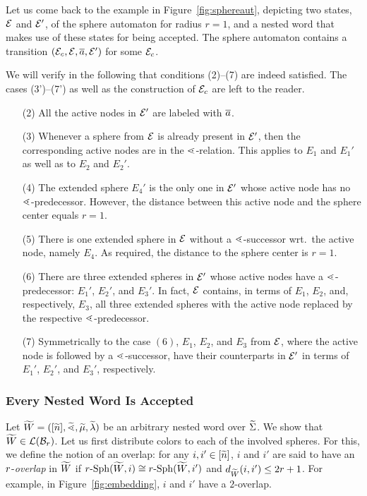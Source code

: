 \documentclass{LMCS}
\begin{document}
Let us come back to the example in Figure~\ref{fig:sphereaut}, depicting two
states, $\mathcal{E}$ and $\mathcal{E}'$, of the sphere automaton for radius $r = 1$,
and a nested word that makes use of these states for being accepted. The
sphere automaton contains a transition $(\mathcal{E}_c,\mathcal{E},{\overline{a}},\mathcal{E}')$ for some
$\mathcal{E}_c$.

We will verify in the following that conditions (2)--(7) are indeed satisfied.
The cases (3')--(7') as well as the construction of $\mathcal{E}_c$ are left to the
reader.
\begin{enumerate}[(2)]\item[(2)] All the active nodes in $\mathcal{E}'$ are labeled with ${\overline{a}}$.
\item[(3)] Whenever a sphere from $\mathcal{E}$ is already present in $\mathcal{E}'$,
  then the corresponding active nodes are in the $\mathrel{\lessdot}$-relation. This
  applies to $E_1$ and $E_1'$ as well as to $E_2$ and $E_2'$.
\item[(4)] The extended sphere $E_4'$ is the only one in $\mathcal{E}'$ whose
  active node has no $\mathrel{\lessdot}$-predecessor. However, the distance between
  this active node and the sphere center equals $r=1$.
\item[(5)] There is one extended sphere in $\mathcal{E}$ without a
  $\mathrel{\lessdot}$-successor wrt.\ the active node, namely $E_4$. As required, the
  distance to the sphere center is $r=1$.
\item[(6)] There are three extended spheres in $\mathcal{E}'$ whose active nodes
  have a $\mathrel{\lessdot}$-predecessor: $E_1'$, $E_2'$, and $E_3'$. In fact, $\mathcal{E}$
  contains, in terms of $E_1$, $E_2$, and, respectively, $E_3$, all three
  extended spheres with the active node replaced by the respective
  $\mathrel{\lessdot}$-predecessor.
\item[(7)] Symmetrically to the case $(6)$, $E_1$, $E_2$, and $E_3$ from
  $\mathcal{E}$, where the active node is followed by a $\mathrel{\lessdot}$-successor, have
  their counterparts in $\mathcal{E}'$ in terms of $E_1'$, $E_2'$, and $E_3'$,
  respectively.
\end{enumerate}

\subsubsection{Every Nested Word Is Accepted}\label{subsect:anyaccepted}

Let ${\widetilde{W}} = ([\widetilde{n}],\widetilde{\mathord{\lessdot}},\widetilde{\mu},\widetilde{\lambda})$ be an arbitrary nested word over
$\widetilde{\Sigma}$. We show that ${\widetilde{W}} \in \mathcal{L}(\mathcal{B}_r)$. Let us first distribute
colors to each of the involved spheres. For this, we define the notion of an
overlap: for any $i,i' \in [\widetilde{n}]$, $i$ and $i'$ are said to have an
$r$-\emph{overlap} in ${\widetilde{W}}$ if $r\text{-}\mathrm{Sph}({\widetilde{W}},i) \cong
r\text{-}\mathrm{Sph}({\widetilde{W}},i')$ and $d_{\widetilde{W}}(i,i') \le 2r + 1$. For example, in
Figure~\ref{fig:embedding}, $i$ and $i'$ have a $2$-overlap.
\end{document}

